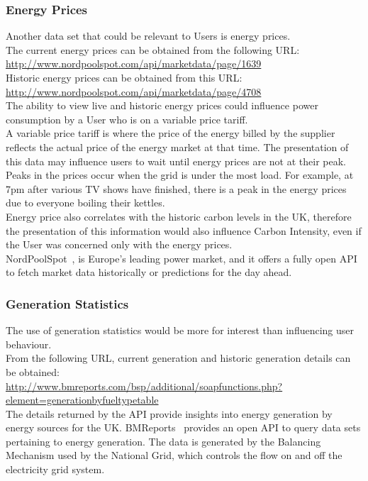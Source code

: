 \documentclass[draft,preprint,12pt,3p]{elsarticle}
\begin{document}
\subsubsection{Energy Prices}
Another data set that could be relevant to Users is energy prices.\\
The current energy prices can be obtained from the following URL:\\[5pt]
 \url{http://www.nordpoolspot.com/api/marketdata/page/1639}\\[5pt]
Historic energy prices can be obtained from this URL:\\[5pt]
 \url{http://www.nordpoolspot.com/api/marketdata/page/4708}\\[5pt]
The ability to view live and historic energy prices could influence power consumption by a User who is on a variable price tariff.\\
A variable price tariff is where the price of the energy billed by the supplier reflects the actual price of the energy market at that time. The presentation of this data may influence users to wait until energy prices are not at their peak.\\
Peaks in the prices occur when the grid is under the most load. For example, at 7pm after various TV shows have finished, there is a peak in the energy prices due to everyone boiling their kettles.\\
Energy price also correlates with the historic carbon levels in the UK, therefore the presentation of this information would also influence Carbon Intensity, even if the User was concerned only with the energy prices.\\
NordPoolSpot~\cite{nordpoolspot}, is Europe's leading power market, and it offers a fully open API to fetch market data historically or predictions for the day ahead.

\subsubsection{Generation Statistics}
The use of generation statistics would be more for interest than influencing user behaviour.\\
From the following URL, current generation and historic generation details can be obtained:\\[5pt]
 \url{http://www.bmreports.com/bsp/additional/soapfunctions.php?element=generationbyfueltypetable}\\[5pt]
The details returned by the API provide insights into energy generation by energy sources for the UK.
BMReports~\cite{bmreports} provides an open API to query data sets pertaining to energy generation. The data is generated by the Balancing Mechanism used by the National Grid, which controls the flow on and off the electricity grid system.
 
\end{document}
